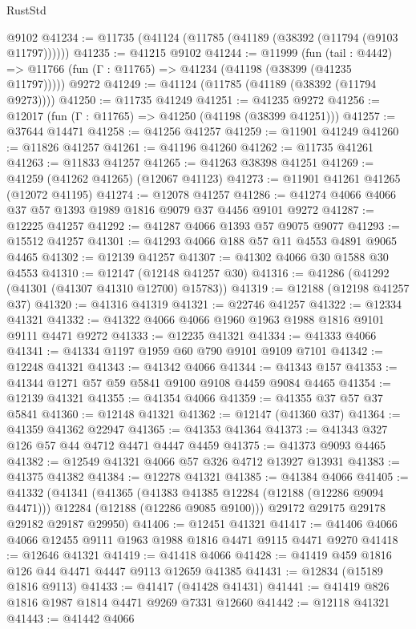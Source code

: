 \begin{lexlean}{RustStd}
\begin{coremodule}
    @9102
@41234 := @11735 (@41124 (@11785 (@41189 (@38392 (@11794 (@9103 @11797))))))
@41235 := @41215 @9102
@41244 := @11999
    (fun (tail : @4442) => @11766 (fun (Γ : @11765) => @41234 (@41198 (@38399 (@41235 @11797)))))
    @9272
@41249 := @41124 (@11785 (@41189 (@38392 (@11794 @9273))))
@41250 := @11735 @41249
@41251 := @41235 @9272
@41256 := @12017 (fun (Γ : @11765) => @41250 (@41198 (@38399 @41251)))
@41257 := @37644 @14471
@41258 := @41256 @41257
@41259 := @11901 @41249
@41260 := @11826 @41257
@41261 := @41196 @41260
@41262 := @11735 @41261
@41263 := @11833 @41257
@41265 := @41263 @38398 @41251
@41269 := @41259 (@41262 @41265) (@12067 @41123)
@41273 := @11901 @41261 @41265 (@12072 @41195)
@41274 := @12078 @41257
@41286 := @41274 @4066 @4066 @37 @57 @1393 @1989 @1816 @9079 @37 @4456 @9101 @9272
@41287 := @12225 @41257
@41292 := @41287 @4066 @1393 @57 @9075 @9077
@41293 := @15512 @41257
@41301 := @41293 @4066 @188 @57 @11 @4553 @4891 @9065 @4465
@41302 := @12139 @41257
@41307 := @41302 @4066 @30 @1588 @30 @4553
@41310 := @12147 (@12148 @41257 @30)
@41316 := @41286 (@41292 (@41301 (@41307 @41310 @12700) @15783))
@41319 := @12188 (@12198 @41257 @37)
@41320 := @41316 @41319
@41321 := @22746 @41257
@41322 := @12334 @41321
@41332 := @41322 @4066 @4066 @1960 @1963 @1988 @1816 @9101 @9111 @4471 @9272
@41333 := @12235 @41321
@41334 := @41333 @4066
@41341 := @41334 @1197 @1959 @60 @790 @9101 @9109 @7101
@41342 := @12248 @41321
@41343 := @41342 @4066
@41344 := @41343 @157
@41353 := @41344 @1271 @57 @59 @5841 @9100 @9108 @4459 @9084 @4465
@41354 := @12139 @41321
@41355 := @41354 @4066
@41359 := @41355 @37 @57 @37 @5841
@41360 := @12148 @41321
@41362 := @12147 (@41360 @37)
@41364 := @41359 @41362 @22947
@41365 := @41353 @41364
@41373 := @41343 @327 @126 @57 @44 @4712 @4471 @4447 @4459
@41375 := @41373 @9093 @4465
@41382 := @12549 @41321 @4066 @57 @326 @4712 @13927 @13931
@41383 := @41375 @41382
@41384 := @12278 @41321
@41385 := @41384 @4066
@41405 := @41332
    (@41341
      (@41365
        (@41383 @41385 @12284 (@12188 (@12286 @9094 @4471)))
        @12284
        (@12188 (@12286 @9085 @9100)))
      @29172
      @29175
      @29178
      @29182
      @29187
      @29950)
@41406 := @12451 @41321
@41417 := @41406 @4066 @4066 @12455 @9111 @1963 @1988 @1816 @4471 @9115 @4471 @9270
@41418 := @12646 @41321
@41419 := @41418 @4066
@41428 := @41419 @459 @1816 @126 @44 @4471 @4447 @9113 @12659 @41385
@41431 := @12834 (@15189 @1816 @9113)
@41433 := @41417 (@41428 @41431)
@41441 := @41419 @826 @1816 @1987 @1814 @4471 @9269 @7331 @12660
@41442 := @12118 @41321
@41443 := @41442 @4066

\end{coremodule}
\end{lexlean}
